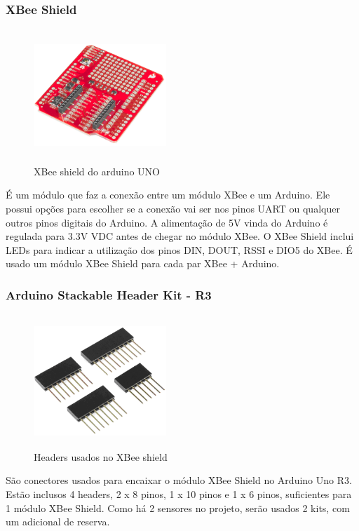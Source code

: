 \subsubsection{XBee Shield}
\begin{figure}[H]
\begin{center}
\includegraphics[width=5cm,height=5cm,keepaspectratio]{figuras/xbee_shield.png}
\caption{\label{fig:xbee shield} XBee shield do arduino UNO}
\end{center}
\end{figure}

É um módulo que faz a conexão entre um módulo XBee e um Arduino. Ele possui opções para escolher se a conexão vai ser nos pinos UART ou qualquer outros pinos digitais do Arduino. A alimentação de 5V vinda do Arduino é regulada para 3.3V VDC antes de chegar no módulo XBee. O XBee Shield inclui LEDs para indicar a utilização dos pinos DIN, DOUT, RSSI e DIO5 do XBee. É usado um módulo XBee Shield para cada par XBee + Arduino.

\subsubsection{Arduino Stackable Header Kit - R3}
\begin{figure}[H]
\begin{center}
\includegraphics[width=5cm,height=5cm,keepaspectratio]{figuras/headers.png}
\caption{\label{fig:xbee shield headers} Headers usados no XBee shield}
\end{center}
\end{figure}

São conectores usados para encaixar o módulo XBee Shield no Arduino Uno R3. Estão inclusos 4 headers, 2 x 8 pinos, 1 x 10 pinos e 1 x 6 pinos, suficientes para 1 módulo XBee Shield. Como há 2 sensores no projeto, serão usados 2 kits, com um adicional de reserva.


